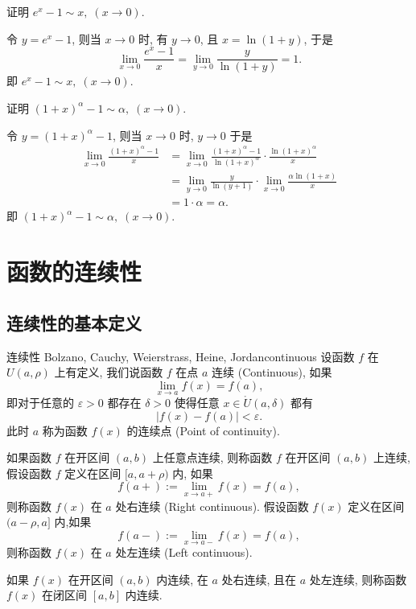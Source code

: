 \documentclass[cn,toc=twocol]{elegantbook}
\begin{document}
\vspace{0.4em}

\begin{example}
	证明 $e^x - 1 \sim x, \;(x \to 0)$. 
\end{example}
\begin{solution}
	令 $y = e^x  - 1$, 则当 $x \to 0$ 时, 有 $y \to 0$, 且 $x = \ln (1 + y)$, 于是
	\[
		\lim_{x \to 0} \frac{e^x - 1}{x} = \lim_{y \to 0} \frac{y}{\ln (1 + y)} = 1.
	\] 
	即 $e^x - 1 \sim x, \;(x \to 0)$.
\end{solution}

\vspace{0.4em}

\begin{example}
	证明 $(1 + x)^\alpha - 1 \sim \alpha, \;(x \to 0)$. 
\end{example}
\begin{solution}
	令 $y = (1 + x)^\alpha - 1$, 则当 $x \to 0$ 时, $y \to 0$ 于是
	\[
	\begin{aligned}
		\lim_{x \to 0} \frac{(1 + x)^\alpha - 1}{x} &= \lim_{x \to 0} \frac{(1 + x)^\alpha - 1}{\ln(1 + x)^\alpha} \cdot \frac{\ln(1 + x)^\alpha}{x}\\
		&= \lim_{y \to 0} \frac{y}{\ln (y + 1)} \cdot \lim_{x \to 0}\frac{\alpha\ln(1 + x)}{x}\\
		&= 1 \cdot \alpha = \alpha.
	\end{aligned}
	\]
	即 $(1 + x)^\alpha - 1 \sim \alpha, \;(x \to 0)$.
\end{solution}

\section{函数的连续性}

\subsection{连续性的基本定义}

\begin{definition}{连续性 Bolzano, Cauchy, Weierstrass, Heine, Jordan}{continuous}
设函数 $f$ 在 $U(a,\rho)$ 上有定义, 我们说函数 $f$ 在点 $a$ 连续 (Continuous), 如果
\[
	\lim_{x \to a} f(x) = f(a),
\]
即对于任意的 $\varepsilon > 0$ 都存在 $\delta > 0$ 使得任意 $x \in \mathring{U}(a,\delta)$ 都有
\[
	\lvert f(x) - f(a) \rvert < \varepsilon.
\]
此时 $a$ 称为函数 $f(x)$ 的连续点 (Point of continuity).

如果函数 $f$ 在开区间 $(a,b)$ 上任意点连续, 则称函数 $f$ 在开区间 $(a,b)$ 上连续, 假设函数 $f$ 定义在区间 $[a,a + \rho)$ 内, 如果
\[
	f(a+) := \lim_{x\to a+} f(x) = f(a),
\]
则称函数 $f(x)$ 在 $a$ 处右连续 (Right continuous). 假设函数 $f(x)$ 定义在区间 $(a−\rho,a]$ 内,如果
\[
	f(a−) := \lim_{x \to a−} f(x) = f(a), 
\]
则称函数 $f(x)$ 在 $a$ 处左连续 (Left continuous).

如果 $f(x)$ 在开区间 $(a,b)$ 内连续, 在 $a$ 处右连续, 且在 $a$ 处左连续, 则称函数 $f(x)$ 在闭区间 $[a, b]$ 内连续.
\end{definition}
\end{document}
